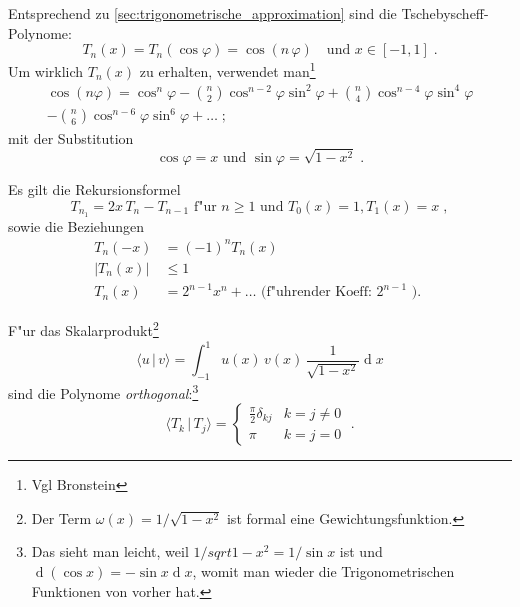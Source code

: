 \documentclass[a4paper]{book}
\newcommand{\diff}{\ensuremath{\operatorname d}}
\begin{document}
Entsprechend zu \ref{sec:trigonometrische_approximation} sind die
Tschebyscheff-Polynome:
\begin{equation}
  \label{eq:45}
  T_n(x) = T_n(\cos \varphi) = \cos(n \, \varphi) \text{ ~ und } x \in
  [-1,1] \;.
\end{equation}
Um wirklich $T_n(x)$ zu erhalten, verwendet man\footnote{Vgl Bronstein}\begin{align}
  \label{eq:46}
  \cos(n\varphi) = 
\cos^n\varphi
- \binom n 2 \cos^{n-2}\varphi\sin^2\varphi
+ \binom n 4 \cos^{n-4}\varphi\sin^4\varphi \\
- \binom n 6 \cos^{n-6}\varphi\sin^6\varphi
+ \dots \;;
 \nonumber
\end{align}
mit der Substitution
\begin{equation}
  \label{eq:47}
  \cos\varphi = x \text{ und } \sin\varphi = \sqrt{1-x^2} \;.
\end{equation}

Es gilt die Rekursionsformel
\begin{equation*}
  T_{n_1} = 2x \, T_n - T_{n-1} \text{ f"ur } n \geq 1 \text{ und }
  T_0(x) = 1, T_1(x) = x \;,
\end{equation*}
sowie die Beziehungen
\begin{align*}
  T_n(-x) &= (-1)^n T_n(x) \\
  | T_n(x) | &\leq 1 \\
  T_n(x) &= 2^{n-1}x^n + \dots \text{ (f"uhrender Koeff: } 2^{n-1}
  \text{ ). }
\end{align*}


F"ur das Skalarprodukt\footnote{Der Term $\omega(x) = 1/\sqrt{1-x^2}$
  ist formal eine Gewichtungsfunktion.}
\begin{equation*}
  \langle u \,|\, v \rangle = \int_{-1}^1
  u(x)\,v(x)\,\frac{1}{\sqrt{1-x^2}} \diff x
\end{equation*}
sind die Polynome \emph{orthogonal}:\footnote{Das sieht man leicht,
  weil $1/sqrt{1-x^2} = 1/\sin x$ ist und $\diff(\cos x) = -\sin x
  \diff x$, womit man wieder die Trigonometrischen Funktionen von
  vorher hat.}
\begin{equation*}
  \langle T_k \,|\,T_j  \rangle =
  \begin{cases}
     \frac{\pi}{2} \delta_{kj} & k=j\neq 0\\
     \pi & k = j = 0 
  \end{cases} \;.
\end{equation*}
\end{document}
